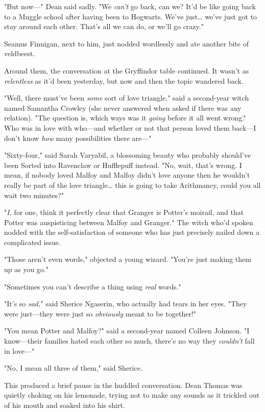 "But now---" Dean said sadly. "We \emph{can't} go back, can we? It'd be like going back to a Muggle school after having been to Hogwarts. We've just{\ldots} we've just got to stay around each other. That's all we can do, or we'll go crazy."

Seamus Finnigan, next to him, just nodded wordlessly and ate another bite of veldbeest.

Around them, the conversation at the Gryffindor table continued. It wasn't as \emph{relentless} as it'd been yesterday, but now and then the topic wandered back.

"Well, there must've been \emph{some} sort of love triangle," said a second-year witch named Samantha Crowley (she never answered when asked if there was any relation). "The question is, which ways was it \emph{going} before it all went wrong? Who was in love with who---and whether or not that person loved them back---I don't know \emph{how} many possibilities there are---"

"Sixty-four," said Sarah Varyabil, a blossoming beauty who probably should've been Sorted into Ravenclaw or Hufflepuff instead. "No, wait, that's wrong. I mean, if nobody loved Malfoy and Malfoy didn't love anyone then he wouldn't really be part of the love triangle{\ldots} this is going to take Arithmancy, could you all wait two minutes?"

"\emph{I,} for one, think it perfectly clear that Granger is Potter's moirail, and that Potter was auspisticing between Malfoy and Granger." The witch who'd spoken nodded with the self-satisfaction of someone who has just precisely nailed down a complicated issue.

"Those aren't even words," objected a young wizard. "You're just making them up as you go."

"Sometimes you can't describe a thing using \emph{real} words."

"It's so \emph{sad,}" said Sherice Ngaserin, who actually had tears in her eyes. "They were just---they were just so \emph{obviously} meant to be together!"

"You mean Potter and Malfoy?" said a second-year named Colleen Johnson. "I know---their families hated each other so much, there's no way they \emph{couldn't} fall in love---"

"No, I mean all three of them," said Sherice.

This produced a brief pause in the huddled conversation. Dean Thomas was quietly choking on his lemonade, trying not to make any sounds as it trickled out of his mouth and soaked into his shirt.

